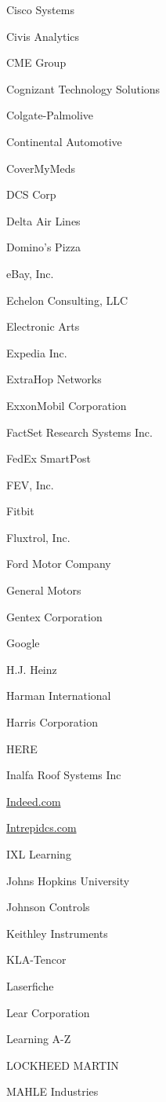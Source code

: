 \documentclass[twoside]{article}
\begin{document}
\begin{center}
\begin{multicols}{5}
\begin{FlushLeft}
\begin{compactitem}
\item Cisco Systems
\item Civis Analytics
\item CME Group
\item Cognizant Technology Solutions
\item Colgate-Palmolive
\item Continental Automotive
\item CoverMyMeds
\item DCS Corp
\item Delta Air Lines
\item Domino's Pizza
\item eBay, Inc.
\item Echelon Consulting, LLC
\item Electronic Arts
\item Expedia Inc.
\item ExtraHop Networks
\item ExxonMobil Corporation
\item FactSet Research Systems Inc.
\item FedEx SmartPost
\item FEV, Inc.
\item Fitbit
\item Fluxtrol, Inc.
\item Ford Motor Company
\item General Motors
\item Gentex Corporation
\item Google
\item H.J. Heinz
\item Harman International
\item Harris Corporation
\item HERE
\item Inalfa Roof Systems Inc
\item \url{Indeed.com}
\item \url{Intrepidcs.com}
\item IXL Learning
\item Johns Hopkins University
\item Johnson Controls
\item Keithley Instruments
\item KLA-Tencor
\item Laserfiche
\item Lear Corporation
\item Learning A-Z
\item LOCKHEED MARTIN
\item MAHLE Industries

\end{compactitem}
\end{FlushLeft}
\end{multicols}
\end{center}
\end{document}
